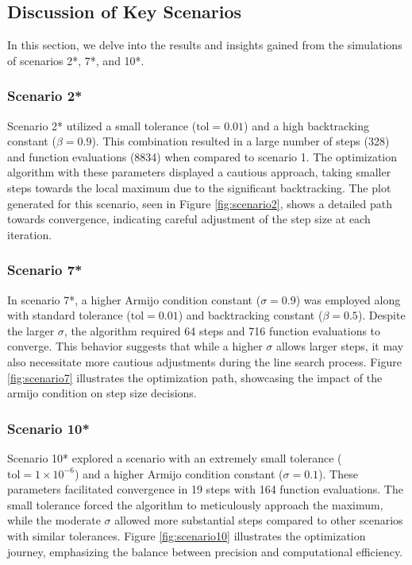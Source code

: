 \documentclass{article}
\begin{document}
\subsection*{Discussion of Key Scenarios}

In this section, we delve into the results and insights gained from the simulations of scenarios 2*, 7*, and 10*.

\subsubsection*{Scenario 2*}

Scenario 2* utilized a small tolerance (\( \text{tol} = 0.01 \)) and a high backtracking constant (\( \beta = 0.9 \)). This combination resulted in a large number of steps (328) and function evaluations (8834) when compared to scenario 1. The optimization algorithm with these parameters displayed a cautious approach, taking smaller steps towards the local maximum due to the significant backtracking. The plot generated for this scenario, seen in Figure \ref{fig:scenario2}, shows a detailed path towards convergence, indicating careful adjustment of the step size at each iteration.

\subsubsection*{Scenario 7*}

In scenario 7*, a higher Armijo condition constant (\( \sigma = 0.9 \)) was employed along with standard tolerance (\( \text{tol} = 0.01 \)) and backtracking constant (\( \beta = 0.5 \)). Despite the larger \( \sigma \), the algorithm required 64 steps and 716 function evaluations to converge. This behavior suggests that while a higher \( \sigma \) allows larger steps, it may also necessitate more cautious adjustments during the line search process. Figure \ref{fig:scenario7} illustrates the optimization path, showcasing the impact of the armijo condition on step size decisions.

\subsubsection*{Scenario 10*}

Scenario 10* explored a scenario with an extremely small tolerance (\( \text{tol} = 1 \times 10^{-6} \)) and a higher Armijo condition constant (\( \sigma = 0.1 \)). These parameters facilitated convergence in 19 steps with 164 function evaluations. The small tolerance forced the algorithm to meticulously approach the maximum, while the moderate \( \sigma \) allowed more substantial steps compared to other scenarios with similar tolerances. Figure \ref{fig:scenario10} illustrates the optimization journey, emphasizing the balance between precision and computational efficiency.
\end{document}
